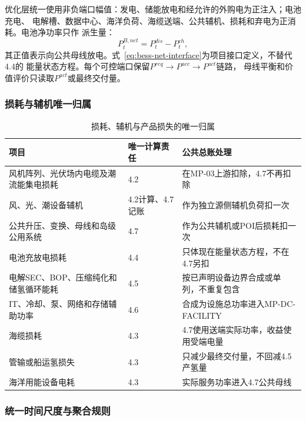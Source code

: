 优化层统一使用非负端口幅值：发电、储能放电和经允许的外购电为正注入；电池充电、
电解槽、数据中心、海洋负荷、海缆送端、公共辅机、损耗和弃电为正消耗。电池净功率只作
派生量：
\begin{equation}
P_t^{B,net}=P_t^{dis}-P_t^{ch},
\label{eq:bess-net-interface}
\end{equation}
其正值表示向公共母线放电。式~\eqref{eq:bess-net-interface}为项目接口定义，不替代4.4的
能量状态方程。每个可控端口保留$P^{req}\rightarrow P^{acc}\rightarrow P^{act}$链路，
母线平衡和价值评价只读取$P^{act}$或最终交付量。

\subsubsection{损耗与辅机唯一归属}

\begin{table}[H]
\centering
\footnotesize
\caption{损耗、辅机与产品损失的唯一归属}
\label{tab:loss-ownership}
\begin{tabularx}{\textwidth}{p{5.0cm} p{2.6cm} X}
\toprule
项目 & 唯一计算责任 & 公共总账处理 \\
\midrule
风机阵列、光伏场内电缆及潮流能集电损耗 & 4.2 & 在MP-03上游扣除，4.7不再扣除 \\
风、光、潮设备辅机 & 4.2计算、4.7记账 & 作为独立源侧辅机负荷扣一次 \\
公共升压、变换、母线和岛级公用系统 & 4.7 & 作为公共辅机或POI后损耗扣一次 \\
电池充放电损耗 & 4.4 & 只体现在能量状态方程，不在4.7另扣 \\
电解SEC、BOP、压缩纯化和储氢循环能耗 & 4.5 & 按已声明设备边界合成或单列，不重复包含 \\
IT、冷却、泵、网络和存储辅助功率 & 4.6 & 合成为设施总功率进入MP-DC-FACILITY \\
海缆损耗 & 4.3 & 4.7使用送端实际功率，收益使用受端电量 \\
管输或船运氢损失 & 4.3 & 只减少最终交付量，不回减4.5产氢量 \\
海洋用能设备电耗 & 4.3 & 实际服务功率进入4.7公共母线 \\
\bottomrule
\end{tabularx}
\end{table}

\subsubsection{统一时间尺度与聚合规则}

